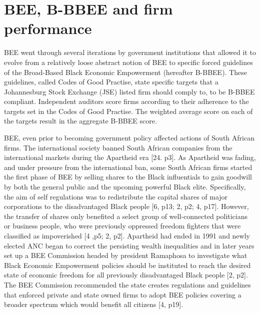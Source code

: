 \section{BEE, B-BBEE and firm performance}
BEE went through several iterations by government institutions that allowed it to evolve from a relatively loose abstract notion of BEE to specific forced guidelines of the Broad-Based Black Economic Empowerment (hereafter B-BBEE). These guidelines, called Codes of Good Practise, state specific targets that a Johannesburg Stock Exchange (JSE) listed firm should comply to, to be B-BBEE compliant. Independent auditors score firms according to their adherence to the targets set in the Codes of Good Practise. The weighted average score on each of the targets result in the aggregate B-BBEE score.

BEE, even prior to becoming government policy affected actions of South African firms. The international society banned South African companies from the international markets during the Apartheid era [24. p3]. As Apartheid was fading, and under pressure from the international ban, some South African firms started the first phase of BEE by selling shares to the Black influentials to gain goodwill by both the general public and the upcoming powerful Black elite.  Specifically, the aim of self regulations was to redistribute the capital shares of major corporations to the disadvantaged Black people [6, p13; 2, p2; 4, p17]. However, the transfer of shares only benefited a select group of well-connected politicians or business people, who were previously oppressed freedom fighters that were classified as impoverished [4 ,p5; 2, p2]. Apartheid had ended in 1991 and newly elected ANC began to correct the persisting wealth inequalities and in later years set up a BEE Commission headed by president Ramaphosa to investigate what Black Economic Empowerment policies should be instituted to reach the desired state of economic freedom for all previously disadvantaged Black people [2, p2]. The BEE Commission recommended the state creates regulations and guidelines that enforced private and state owned firms to adopt BEE policies covering a broader spectrum which would benefit all citizens [4, p19].


